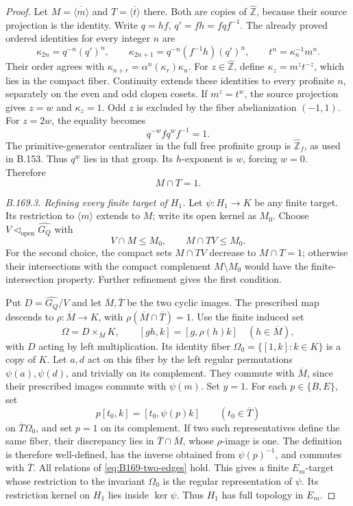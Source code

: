 \begin{proof}
Let \(M=\overline{\langle m\rangle}\) and
\(T=\overline{\langle t\rangle}\) there. Both are copies of
\(\widehat{\mathbb Z}\), because their source projection is the identity.
Write \(q=hf\), \(q'=fh=fqf^{-1}\). The already proved ordered identities
for every integer \(n\) are
\[
 \kappa_{2n}=q^{-n}(q')^n,\qquad
 \kappa_{2n+1}=q^{-n}(f^{-1}h)(q')^n,\qquad
 t^n=\kappa_n^{-1}m^n.
 \tag{B.169.2}
\]
Their order agrees with
\(\kappa_{n+r}=\alpha^n(\kappa_r)\kappa_n\).
For \(z\in\widehat{\mathbb Z}\), define
\(\kappa_z=m^zt^{-z}\), which lies in the compact fiber.
Continuity extends these identities to every profinite \(n\), separately
on the even and odd clopen cosets. If \(m^z=t^w\), the source projection
gives \(z=w\) and \(\kappa_z=1\). Odd \(z\) is excluded by the fiber
abelianization \((-1,1)\). For \(z=2w\), the equality becomes
\[
 q^{-w}fq^wf^{-1}=1.
\]
The primitive-generator centralizer in the full free profinite group
is \(\widehat{\mathbb Z}_f\), as used in B.153. Thus \(q^w\) lies in that
group. Its \(h\)-exponent is \(w\), forcing \(w=0\). Therefore
\begin{equation}\label{eq:B169-cyclic-intersection}
                         M\cap T=1.
\end{equation}

\emph{B.169.3. Refining every finite target of \(H_1\).}
Let \(\psi:H_1\to K\) be any finite target. Its restriction to
\(\langle m\rangle\) extends to \(M\); write its open kernel as \(M_0\).
Choose \(V\triangleleft_{\mathrm{open}}\widehat{G_Q}\) with
\[
 V\cap M\le M_0,\qquad M\cap TV\le M_0.
 \tag{B.169.3}
\]
For the second choice, the compact sets \(M\cap TV\) decrease to
\(M\cap T=1\); otherwise their intersections with the compact complement
\(M\setminus M_0\) would have the finite-intersection property.
Further refinement gives the first condition.

Put \(D=\widehat{G_Q}/V\) and let \(\overline M,\overline T\) be the
two cyclic images. The prescribed map descends to
\(\rho:\overline M\to K\), with
\(\rho(\overline M\cap\overline T)=1\).
Use the finite induced set
\[
 \Omega=D\times_{\overline M}K,\qquad
 [gh,k]=[g,\rho(h)k]\quad(h\in\overline M),
\]
with \(D\) acting by left multiplication. Its identity fiber
\(\Omega_0=\{[1,k]:k\in K\}\) is a copy of \(K\).
Let \(a,d\) act on this fiber by the left regular permutations
\(\psi(a),\psi(d)\), and trivially on its complement. They commute
with \(\overline M\), since their prescribed images commute with
\(\psi(m)\). Set \(y=1\). For each \(p\in\{B,E\}\), set
\[
 p[t_0,k]=[t_0,\psi(p)k]\qquad(t_0\in\overline T)
\]
on \(\overline T\Omega_0\), and set \(p=1\) on its complement.
If two such representatives define the same fiber, their discrepancy
lies in \(\overline T\cap\overline M\), whose \(\rho\)-image is one.
The definition is therefore well-defined, has the inverse obtained
from \(\psi(p)^{-1}\), and commutes with \(\overline T\).
All relations of \eqref{eq:B169-two-edges} hold.
This gives a finite \(E_m\)-target whose restriction to the invariant
\(\Omega_0\) is the regular representation of \(\psi\).
Its restriction kernel on \(H_1\) lies inside \(\ker\psi\).
Thus \(H_1\) has full topology in \(E_m\).


\end{proof}
